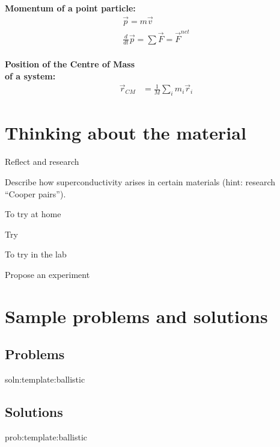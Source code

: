\newpage
\begin{importantEquations}
\medskip
\begin{multicols}{2}
\textbf{Momentum of a point particle:}
\begin{align*}
\vec p = m\vec v \\
\frac{d}{dt}\vec p = \sum \vec F = \vec F^{net}
\end{align*}
\columnbreak
\\
\textbf{Position of the Centre of Mass \\ of a system:}
\begin{align*}
\vec r_{CM} &=\frac{1}{M}\sum_i m_i\vec r_i 
\end{align*}
\medskip
\end{multicols}
\end{importantEquations}

\newpage
\section{Thinking about the material}

\begin{chapteractivity}{Reflect and research}
{
\item Describe how superconductivity arises in certain materials (hint: research ``Cooper pairs'').
}
\end{chapteractivity}

\begin{chapteractivity}{To try at home}
{
\item Try
}
\end{chapteractivity}

\begin{chapteractivity}{To try in the lab}
{
\item Propose an experiment
}
\end{chapteractivity}

\newpage
\section{Sample problems and solutions}
\subsection{Problems}
\begin{problem}{soln:template:ballistic}{\label{prob:template:ballistic} 

}
\end{problem}

\newpage
\subsection{Solutions}
\begin{solution}{prob:template:ballistic}\label{soln:template:ballistic}

\end{solution}

